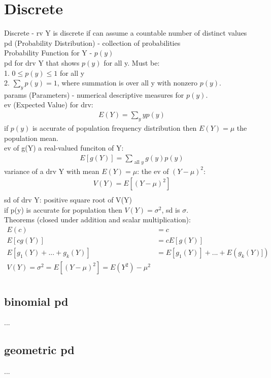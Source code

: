 \documentclass[12pt]{article}
\begin{document}
\section{Discrete}
	Discrete - rv Y is discrete if can assume a countable number of distinct values \\
	pd (Probability Distribution) - collection of probabilities \\
	Probability Function for Y - $ p(y) $ \\
	pd for drv Y that shows $ p(y) $ for all y. Must be: \\
	1. $ 0 \le p(y) \le 1 $ for all y \\
	2. $ \sum_y p(y) = 1 $, where summation is over all y with nonzero $ p(y) $.\\
	params (Parameters) - numerical descriptive measures for $ p(y) $. \\
	ev (Expected Value) for drv:
	\begin{align*}
		E(Y) = \sum_y yp(y)
	\end{align*}
	if $ p(y) $ is accurate of population frequency distribution then
	$ E(Y) = \mu $ the population mean. \\
	ev of g(Y) a real-valued funciton of Y:
	\begin{align*}
		E[g(Y)] = \sum_{\text{ all } y }g(y)p(y)
	\end{align*}
	variance of a drv Y with mean $ E(Y) = \mu $: the ev of $ (Y-\mu)^2 $:
	\begin{align*}
		V(Y) = E[(Y-\mu)^2] \\
	\end{align*}
	sd of drv Y: positive square root of V(Y) \\
	if p(y) is accurate for population then $ V(Y) = \sigma^2 $, sd is $ \sigma $. \\
	Theorems (closed under addition and scalar multiplication):
	\begin{align*}
		E(c) &= c \\
		E[cg(Y)] &= cE[g(Y)] \\
		E[g_1(Y)+...+g_k(Y)] &= E[g_1(Y)] + ... + E(g_k(Y)]) \\
		V(Y) = \sigma^2 = E[(Y-\mu)^2] =  E(Y^2) - \mu^2 \\
	\end{align*}
	\subsection{binomial pd}
		...
	\subsection{geometric pd}
		...
\end{document}
